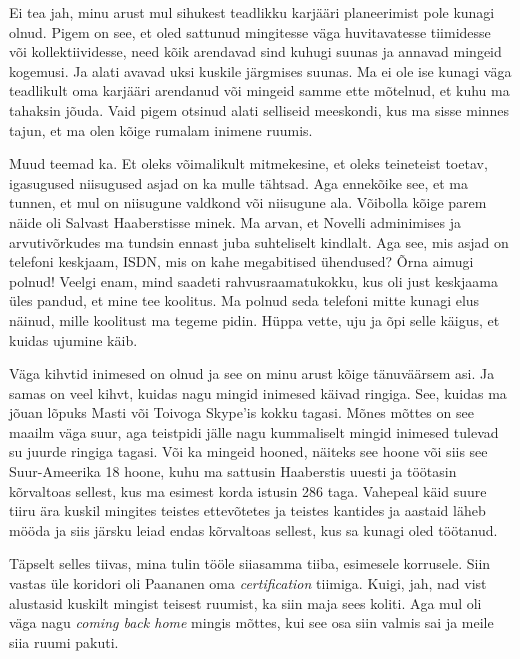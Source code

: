 
Ei tea jah, minu arust mul sihukest teadlikku karjääri planeerimist pole kunagi olnud. Pigem on see, et oled sattunud mingitesse väga huvitavatesse tiimidesse või kollektiividesse, need kõik arendavad sind kuhugi suunas ja annavad  mingeid kogemusi. Ja alati avavad uksi kuskile järgmises suunas. Ma ei ole ise kunagi  väga teadlikult oma karjääri arendanud või mingeid samme ette mõtelnud, et kuhu ma tahaksin jõuda. Vaid pigem otsinud alati selliseid meeskondi, kus ma sisse minnes tajun, et ma olen kõige rumalam inimene ruumis. 


Muud teemad ka. Et oleks võimalikult mitmekesine, et oleks teineteist toetav, igasugused niisugused asjad on ka mulle tähtsad. Aga ennekõike see, et ma tunnen, et mul on niisugune valdkond või niisugune ala. Võibolla kõige parem näide oli Salvast Haaberstisse minek. Ma arvan, et Novelli adminimises ja arvutivõrkudes ma tundsin ennast juba suhteliselt kindlalt.  Aga see, mis asjad on telefoni keskjaam, ISDN, mis on kahe megabitised ühendused? Õrna aimugi polnud! Veelgi enam, mind saadeti rahvusraamatukokku, kus oli just keskjaama üles pandud, et mine tee koolitus. Ma polnud seda telefoni mitte kunagi elus näinud, mille koolitust ma tegeme pidin. Hüppa vette, uju ja õpi selle käigus, et kuidas ujumine käib. 

Väga kihvtid inimesed on olnud ja see on minu arust kõige tänuväärsem asi. Ja samas on veel kihvt, kuidas nagu mingid inimesed käivad ringiga. See, kuidas ma jõuan lõpuks Masti või Toivoga Skype'is kokku tagasi. Mõnes mõttes on see maailm väga suur, aga  teistpidi jälle nagu kummaliselt mingid inimesed tulevad su juurde  ringiga tagasi. Või ka mingeid hooned, näiteks see hoone või siis see Suur-Ameerika 18 hoone, kuhu ma sattusin  Haaberstis uuesti ja töötasin kõrvaltoas sellest, kus ma esimest korda istusin 286 taga. Vahepeal käid suure tiiru ära kuskil mingites teistes ettevõtetes ja teistes kantides ja aastaid läheb mööda ja siis järsku leiad endas kõrvaltoas sellest, kus sa kunagi oled töötanud. 


Täpselt selles tiivas, mina tulin tööle siiasamma tiiba, esimesele korrusele. Siin vastas üle koridori oli Paananen oma \emph{certification} tiimiga. Kuigi, jah, nad vist alustasid kuskilt mingist teisest ruumist, ka siin maja sees koliti. Aga mul oli väga nagu \emph{coming back home} mingis mõttes, kui see osa siin valmis sai ja meile siia ruumi pakuti. 